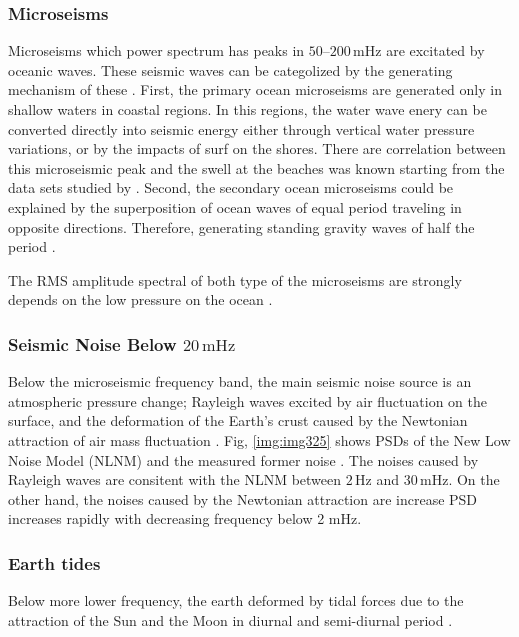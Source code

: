 \subsubsection{Microseisms}
Microseisms which power spectrum has peaks in $50$--$200\,\mathrm{mHz}$ are excitated by oceanic waves. These seismic waves can be categolized by the generating mechanism of these \cite{Bormann2012new}. First, the primary ocean microseisms are generated only in shallow waters in coastal regions. In this regions, the water wave enery can be converted directly into seismic energy either through vertical water pressure variations, or by the impacts of surf on the shores. There are correlation between this microseismic peak and the swell at the beaches was known starting from the data sets studied by \cite{haubrich1963comparative}. Second, the secondary ocean microseisms could be explained by the superposition of ocean waves of equal period traveling in opposite directions. Therefore, generating standing gravity waves of half the period \cite{longuet1950theory}.

The RMS amplitude spectral of both type of the microseisms are strongly depends on the low pressure on the ocean \cite{naticchioni2014microseismic}.

\subsubsection{Seismic Noise Below $20\,\mathrm{mHz}$}
Below the microseismic frequency band, the main seismic noise source is an atmospheric pressure change; Rayleigh waves excited by air fluctuation on the surface, and the deformation of the Earth's crust caused by the Newtonian attraction of air mass fluctuation \cite{sorrells1971earth,zurn1995noise}. Fig, \ref{img:img325} shows PSDs of the New Low Noise Model (NLNM) \cite{peterson1993observations} and the measured former noise \cite{nishida2002origin}. The noises caused by Rayleigh waves are consitent with the NLNM between $2\,\mathrm{Hz}$ and $30\,\mathrm{mHz}$. On the other hand, the noises caused by the Newtonian attraction are increase PSD increases rapidly with decreasing frequency below 2 mHz.


\subsubsection{Earth tides}
Below more lower frequency, the earth deformed by tidal forces due to the attraction of the Sun and the Moon in diurnal and semi-diurnal period \cite{agnew2005earth}. 

